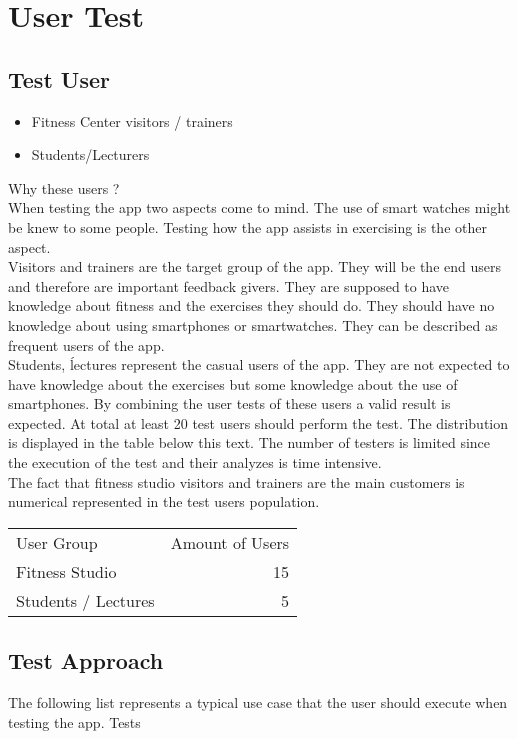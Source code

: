 \section{User Test}

\subsection{Test User}
\begin{itemize}
 \item Fitness Center visitors / trainers
 \item Students/Lecturers
 \end{itemize}

Why these users ?\\
When testing the app two aspects come to mind. The use of smart watches might be knew to some people. Testing how the app assists in exercising is the other aspect.\\
Visitors and trainers are the target group of the app. They will be the end users and therefore are important feedback givers. They are supposed to have knowledge about fitness and the exercises they should do. They should have no knowledge about using smartphones or smartwatches. They can be described as frequent users of the app. \\
Students, ĺectures represent the casual users of the app. They are not expected to have knowledge about the exercises but some knowledge about the use of smartphones.
By combining the user tests of these users a valid result is expected.
At total at least 20 test users should perform the test. The distribution is displayed in the table below this text. The number of testers is limited since the execution of the test and their analyzes is time intensive.\\
The fact that fitness studio visitors and trainers are the main customers is numerical represented in the test users population.

\begin{tabular}{ l r }
User Group & Amount of Users \\
Fitness Studio & 15 \\
Students / Lectures &  5 \\
\end{tabular}

\subsection{Test Approach}
The following list represents a typical use case that the user should execute when testing the app.
Tests\\

